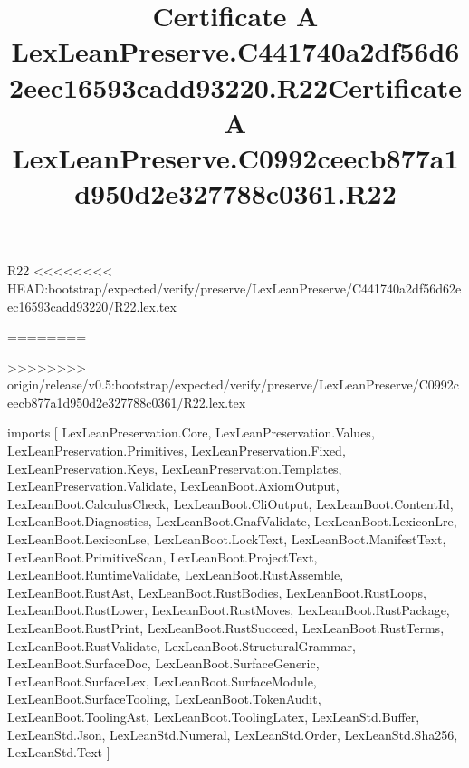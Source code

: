 \begin{lexlean}{R22}
<<<<<<<< HEAD:bootstrap/expected/verify/preserve/LexLeanPreserve/C441740a2df56d62eec16593cadd93220/R22.lex.tex
\title{Certificate A LexLeanPreserve.C441740a2df56d62eec16593cadd93220.R22}
========
\title{Certificate A LexLeanPreserve.C0992ceecb877a1d950d2e327788c0361.R22}
>>>>>>>> origin/release/v0.5:bootstrap/expected/verify/preserve/LexLeanPreserve/C0992ceecb877a1d950d2e327788c0361/R22.lex.tex
\begin{coremodule}
imports [
  LexLeanPreservation.Core,
  LexLeanPreservation.Values,
  LexLeanPreservation.Primitives,
  LexLeanPreservation.Fixed,
  LexLeanPreservation.Keys,
  LexLeanPreservation.Templates,
  LexLeanPreservation.Validate,
  LexLeanBoot.AxiomOutput,
  LexLeanBoot.CalculusCheck,
  LexLeanBoot.CliOutput,
  LexLeanBoot.ContentId,
  LexLeanBoot.Diagnostics,
  LexLeanBoot.GnafValidate,
  LexLeanBoot.LexiconLre,
  LexLeanBoot.LexiconLse,
  LexLeanBoot.LockText,
  LexLeanBoot.ManifestText,
  LexLeanBoot.PrimitiveScan,
  LexLeanBoot.ProjectText,
  LexLeanBoot.RuntimeValidate,
  LexLeanBoot.RustAssemble,
  LexLeanBoot.RustAst,
  LexLeanBoot.RustBodies,
  LexLeanBoot.RustLoops,
  LexLeanBoot.RustLower,
  LexLeanBoot.RustMoves,
  LexLeanBoot.RustPackage,
  LexLeanBoot.RustPrint,
  LexLeanBoot.RustSucceed,
  LexLeanBoot.RustTerms,
  LexLeanBoot.RustValidate,
  LexLeanBoot.StructuralGrammar,
  LexLeanBoot.SurfaceDoc,
  LexLeanBoot.SurfaceGeneric,
  LexLeanBoot.SurfaceLex,
  LexLeanBoot.SurfaceModule,
  LexLeanBoot.SurfaceTooling,
  LexLeanBoot.TokenAudit,
  LexLeanBoot.ToolingAst,
  LexLeanBoot.ToolingLatex,
  LexLeanStd.Buffer,
  LexLeanStd.Json,
  LexLeanStd.Numeral,
  LexLeanStd.Order,
  LexLeanStd.Sha256,
  LexLeanStd.Text
]


\end{coremodule}
\end{lexlean}
